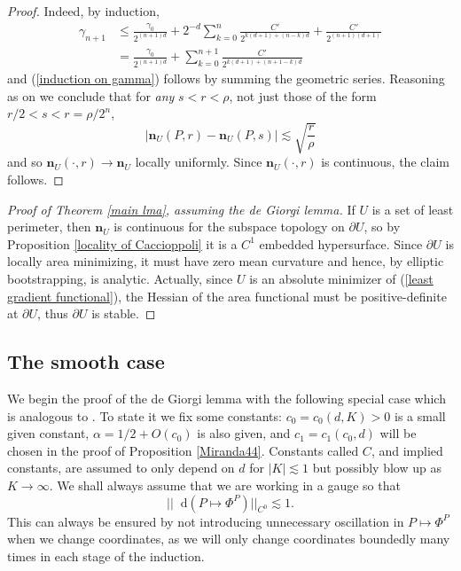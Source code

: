 \documentclass[reqno,11pt]{amsart}
\newcommand*\dif{\mathop{}\!\mathrm{d}}
\newcommand{\normal}{\mathbf n}
\theoremstyle{definition}
\numberwithin{equation}{section}
\begin{document}
\begin{proof}
Indeed, by induction,
\begin{align*}
\gamma_{n + 1}
&\leq \frac{\gamma_0}{2^{(n + 1)d}} + 2^{-d} \sum_{k=0}^n \frac{C'}{2^{k(d + 1) + (n - k)d}} + \frac{C'}{2^{(n + 1)(d + 1)}} \\
&= \frac{\gamma_0}{2^{(n + 1)d}} + \sum_{k=0}^{n + 1} \frac{C'}{2^{k(d + 1) + (n + 1 - k)d}}
\end{align*}
and (\ref{induction on gamma}) follows by summing the geometric series.
Reasoning as on \cite[pg100]{Giusti77} we conclude that for \emph{any} $s < r < \rho$, not just those of the form $r/2 < s < r = \rho/2^n$,
$$|\normal_U(P, r) - \normal_U(P, s)| \lesssim \sqrt{\frac{r}{\rho}}$$
and so $\normal_U(\cdot, r) \to \normal_U$ locally uniformly.
Since $\normal_U(\cdot, r)$ is continuous, the claim follows.
\end{proof}

\begin{proof}[Proof of Theorem \ref{main lma}, assuming the de Giorgi lemma]
If $U$ is a set of least perimeter, then $\normal_U$ is continuous for the subspace topology on $\partial U$, so by Proposition \ref{locality of Caccioppoli} it is a $C^1$ embedded hypersurface.
Since $\partial U$ is locally area minimizing, it must have zero mean curvature and hence, by elliptic bootstrapping, is analytic.
Actually, since $U$ is an absolute minimizer of (\ref{least gradient functional}), the Hessian of the area functional must be positive-definite at $\partial U$, thus $\partial U$ is stable.
\end{proof}


\subsection{The smooth case}
We begin the proof of the de Giorgi lemma with the following special case which is analogous to \cite[Lemma 6.4]{Giusti77}.
To state it we fix some constants: $c_0 = c_0(d, K) > 0$ is a small given constant, $\alpha = 1/2 + O(c_0)$ is also given, and $c_1 = c_1(c_0, d)$ will be chosen in the proof of Proposition \ref{Miranda44}.
Constants called $C$, and implied constants, are assumed to only depend on $d$ for $|K| \lesssim 1$ but possibly blow up as $K \to \infty$.
We shall always assume that we are working in a gauge so that
\begin{equation}\label{oscillation of isometries}
||\dif(P \mapsto \Phi^P)||_{C^0} \lesssim 1.
\end{equation}
This can always be ensured by not introducing unnecessary oscillation in $P \mapsto \Phi^P$ when we change coordinates, as we will only change coordinates boundedly many times in each stage of the induction.
\end{document}
